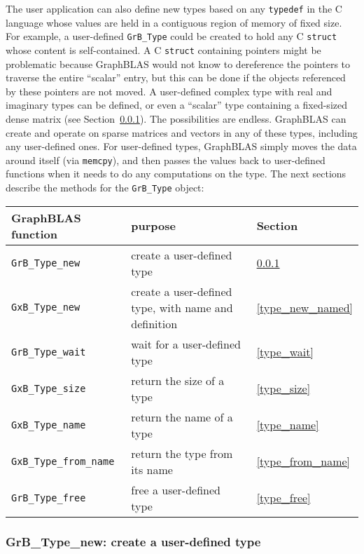\documentclass[12pt]{article}
\begin{document}
The user application can also define new types based on any \verb'typedef' in
the C language whose values are held in a contiguous region of memory of fixed
size.  For example, a user-defined \verb'GrB_Type' could be created to hold any
C \verb'struct' whose content is self-contained.  A C \verb'struct' containing
pointers might be problematic because GraphBLAS would not know to dereference
the pointers to traverse the entire ``scalar'' entry, but this can be done if
the objects referenced by these pointers are not moved.  A user-defined complex
type with real and imaginary types can be defined, or even a ``scalar'' type
containing a fixed-sized dense matrix (see Section~\ref{type_new}).  The
possibilities are endless.  GraphBLAS can create and operate on sparse matrices
and vectors in any of these types, including any user-defined ones.  For
user-defined types, GraphBLAS simply moves the data around itself (via
\verb'memcpy'), and then passes the values back to user-defined functions when
it needs to do any computations on the type.  The next sections describe the
methods for the \verb'GrB_Type' object:

\vspace{0.2in}
{\footnotesize
\begin{tabular}{lll}
\hline
GraphBLAS function       & purpose                          & Section \\
\hline
\verb'GrB_Type_new'      & create a user-defined type       & \ref{type_new} \\
\verb'GxB_Type_new'      & create a user-defined type,
                            with name and definition        & \ref{type_new_named} \\
\verb'GrB_Type_wait'     & wait for a user-defined type     & \ref{type_wait} \\
\verb'GxB_Type_size'     & return the size of a type        & \ref{type_size} \\
\verb'GxB_Type_name'     & return the name of a type        & \ref{type_name} \\
\verb'GxB_Type_from_name'& return the type from its name    & \ref{type_from_name} \\
\verb'GrB_Type_free'     & free a user-defined type         & \ref{type_free} \\
\hline
\end{tabular}
}

\subsubsection{{\sf GrB\_Type\_new:} create a user-defined type}
\label{type_new}
\end{document}
